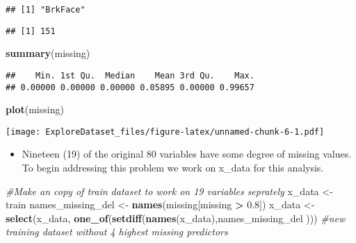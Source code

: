 \documentclass[]{article}
\newenvironment{Shaded}{\begin{snugshade}}{\end{snugshade}}
\newcommand{\CommentTok}[1]{\textcolor[rgb]{0.56,0.35,0.01}{\textit{#1}}}
\newcommand{\DecValTok}[1]{\textcolor[rgb]{0.00,0.00,0.81}{#1}}
\newcommand{\FloatTok}[1]{\textcolor[rgb]{0.00,0.00,0.81}{#1}}
\newcommand{\KeywordTok}[1]{\textcolor[rgb]{0.13,0.29,0.53}{\textbf{#1}}}
\newcommand{\NormalTok}[1]{#1}
\newcommand{\OperatorTok}[1]{\textcolor[rgb]{0.81,0.36,0.00}{\textbf{#1}}}
\newcommand{\StringTok}[1]{\textcolor[rgb]{0.31,0.60,0.02}{#1}}
\providecommand{\tightlist}{%
  \setlength{\itemsep}{0pt}\setlength{\parskip}{0pt}}
\begin{document}
\begin{Shaded}
\end{Shaded}

\begin{verbatim}
## [1] "BrkFace"
\end{verbatim}

\begin{Shaded}
\end{Shaded}

\begin{verbatim}
## [1] 151
\end{verbatim}

\begin{Shaded}
\begin{Highlighting}[]
\KeywordTok{summary}\NormalTok{(missing)}
\end{Highlighting}
\end{Shaded}

\begin{verbatim}
##    Min. 1st Qu.  Median    Mean 3rd Qu.    Max. 
## 0.00000 0.00000 0.00000 0.05895 0.00000 0.99657
\end{verbatim}

\begin{Shaded}
\begin{Highlighting}[]
\KeywordTok{plot}\NormalTok{(missing)}
\end{Highlighting}
\end{Shaded}

\texttt{[image: ExploreDataset\_files/figure-latex/unnamed-chunk-6-1.pdf]}

\begin{itemize}
\tightlist
\item
  Nineteen (19) of the original 80 variables have some degree of missing
  values. To begin addressing this problem we work on x\_data for this
  analysis.
\end{itemize}

\begin{Shaded}
\begin{Highlighting}[]
\CommentTok{#Make an copy of train dataset to work on 19 variables seprately }
\NormalTok{x_data <-}\StringTok{ }\NormalTok{train}
\NormalTok{names_missing_del <-}\StringTok{ }\KeywordTok{names}\NormalTok{(missing[missing }\OperatorTok{>}\StringTok{ }\FloatTok{0.8}\NormalTok{])}
\NormalTok{x_data <-}\StringTok{ }\KeywordTok{select}\NormalTok{(x_data, }\KeywordTok{one_of}\NormalTok{(}\KeywordTok{setdiff}\NormalTok{(}\KeywordTok{names}\NormalTok{(x_data),names_missing_del ))) }\CommentTok{#new training dataset without 4 highest missing predictors}
\end{Highlighting}
\end{Shaded}
\end{document}
